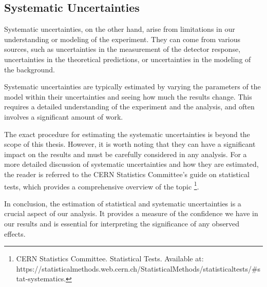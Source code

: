 \subsection{Systematic Uncertainties}

Systematic uncertainties, on the other hand, arise from limitations in our understanding or modeling of the experiment.
They can come from various sources, such as uncertainties in the measurement of the detector response, uncertainties in
the theoretical predictions, or uncertainties in the modeling of the background.

Systematic uncertainties are typically estimated by varying the parameters of the model within their uncertainties and
seeing how much the results change. This requires a detailed understanding of the experiment and the analysis, and often
involves a significant amount of work.

The exact procedure for estimating the systematic uncertainties is beyond the scope of this thesis. However, it is worth
noting that they can have a significant impact on the results and must be carefully considered in any analysis. For a
more detailed discussion of systematic uncertainties and how they are estimated, the reader is referred to the CERN
Statistics Committee's guide on statistical tests, which provides a comprehensive overview of the topic
\footnote{CERN Statistics Committee. Statistical Tests. Available at:\\
    https://statisticalmethods.web.cern.ch/StatisticalMethods/statisticaltests/\#stat-systematics.}.

In conclusion, the estimation of statistical and systematic uncertainties is a crucial aspect of our analysis. It
provides a measure of the confidence we have in our results and is essential for interpreting the significance of any
observed effects.







